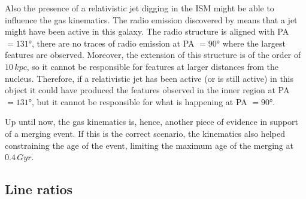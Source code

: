 \documentclass[../thesis.tex]{subfiles}
\begin{document}
Also the presence of a relativistic jet digging in the ISM might be able to influence the gas kinematics.
The radio emission discovered by \citet{Congiu17} means that a jet might have been active in this galaxy.
The radio structure is aligned with PA $=\ang{131}$, there are no traces of radio emission at PA $=\ang{90}$ where the largest features are observed.
Moreover, the extension of this structure is of the order of $10\,\si{kpc}$, so it cannot be responsible for features at larger distances from the nucleus.
Therefore, if a relativistic jet has been active (or is still active) in this object it could have produced the features observed in the inner region at PA $=\ang{131}$, but it cannot be responsible for what is happening at PA $=\ang{90}$.

Up until now, the gas kinematics is, hence, another piece of evidence in support of a merging event.
If this is the correct scenario, the kinematics also helped constraining the age of the event, limiting the maximum age of the merging at $0.4\,\si{Gyr}$.


\subsection{Line ratios}
\label{sec:pap3_lineratios}
\end{document}
